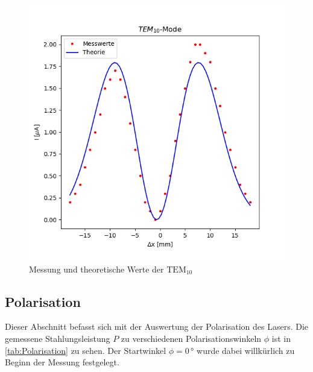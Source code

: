 \begin{figure}
\includegraphics{figures/TEM_10.png}
\caption{Messung und theoretische Werte der $\text{TEM}_{10}$}
\label{fig:TEM_10}
\end{figure}










\clearpage
 
\subsection{Polarisation}
\label{sec:Polarisation}

Dieser Abschnitt befasst sich mit der Auswertung der Polarisation des Lasers. Die gemessene Stahlungsleistung $P$ zu verschiedenen Polarisationswinkeln $\phi$ ist in \autoref{tab:Polarisation} zu sehen. Der Startwinkel $\phi = 0$\,° wurde dabei willkürlich zu Beginn der Messung festgelegt.


